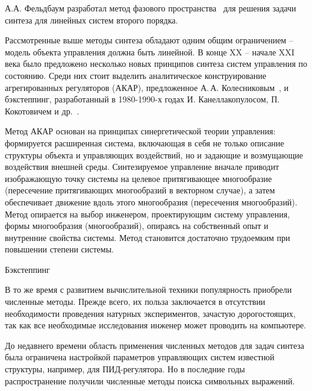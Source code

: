 

А.А. Фельдбаум разработал метод фазового пространства~\cite{Фельдбаум1953, Фельдбаум1955} для решения задачи синтеза для линейных систем второго порядка.

Рассмотренные выше методы синтеза обладают одним общим ограничением -- модель объекта управления должна быть линейной. 
В конце XX -- начале XXI века было предложено несколько новых принципов синтеза систем управления по состоянию.
Среди них стоит выделить аналитическое конструирование агрегированных регуляторов (АКАР), предложенное А.\,А. Колесниковым~\cite{Колесников2006, Колесников1994}, и бэкстеппинг, разработанный в 1980-1990-х годах И. Канеллакопулосом, П. Кокотовичем и др.~\cite{Kanellakopoulos1989, Kanellakopoulos1991, Krstic1995}.

Метод АКАР основан на принципах синергетической теории управления: формируется расширенная система, включающая в себя не только описание структуры объекта и управляющих воздействий, но и задающие и возмущающие воздействия внешней среды. Синтезируемое управление вначале приводит изображающую точку системы на целевое притягивающее многообразие (пересечение притягивающих многообразий в векторном случае), а затем обеспечивает движение вдоль этого многообразия (пересечения многообразий). Метод опирается на выбор инженером, проектирующим систему управления, формы многообразия (многообразий), опираясь на собственный опыт и внутренние свойства системы. Метод становится достаточно трудоемким при повышении степени системы.

Бэкстеппинг 

В то же время с развитием вычислительной техники популярность приобрели численные методы.
Прежде всего, их польза заключается в отсутствии необходимости проведения натурных экспериментов, зачастую дорогостоящих, так как все необходимые исследования инженер может проводить на компьютере.

До недавнего времени область применения численных методов для задач синтеза была ограничена настройкой параметров управляющих систем известной структуры, например, для ПИД-регулятора.
Но в последние годы распространение получили численные методы поиска символьных выражений.

